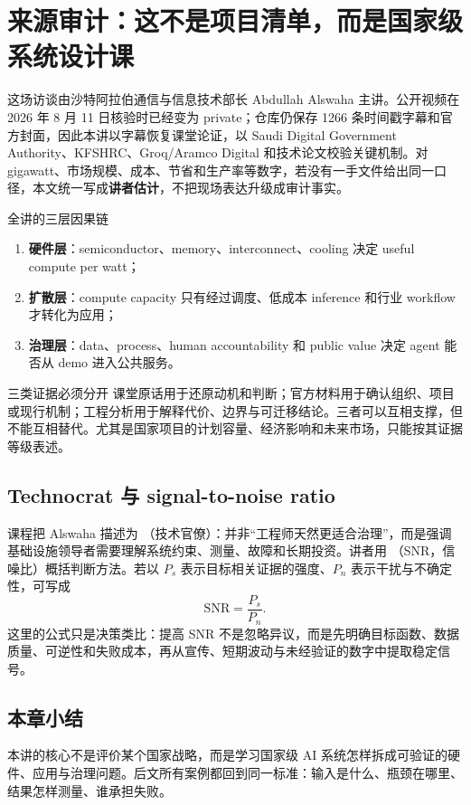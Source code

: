 \section{来源审计：这不是项目清单，而是国家级系统设计课}

这场访谈由沙特阿拉伯通信与信息技术部长 Abdullah Alswaha 主讲。公开视频在 2026 年 8 月 11 日核验时已经变为 private；仓库仍保存 1266 条时间戳字幕和官方封面，因此本讲以字幕恢复课堂论证，以 Saudi Digital Government Authority、KFSHRC、Groq/Aramco Digital 和技术论文校验关键机制。对 gigawatt、市场规模、成本、节省和生产率等数字，若没有一手文件给出同一口径，本文统一写成\textbf{讲者估计}，不把现场表达升级成审计事实。

\begin{importantbox}{全讲的三层因果链}
\begin{enumerate}
  \item \textbf{硬件层}：semiconductor、memory、interconnect、cooling 决定 useful compute per watt；
  \item \textbf{扩散层}：compute capacity 只有经过调度、低成本 inference 和行业 workflow 才转化为应用；
  \item \textbf{治理层}：data、process、human accountability 和 public value 决定 agent 能否从 demo 进入公共服务。
\end{enumerate}
\end{importantbox}

\begin{warningbox}{三类证据必须分开}
课堂原话用于还原动机和判断；官方材料用于确认组织、项目或现行机制；工程分析用于解释代价、边界与可迁移结论。三者可以互相支撑，但不能互相替代。尤其是国家项目的计划容量、经济影响和未来市场，只能按其证据等级表述。
\end{warningbox}

\subsection{Technocrat 与 signal-to-noise ratio}

课程把 Alswaha 描述为 （技术官僚）：并非“工程师天然更适合治理”，而是强调基础设施领导者需要理解系统约束、测量、故障和长期投资。讲者用 （SNR，信噪比）概括判断方法。若以 $P_s$ 表示目标相关证据的强度、$P_n$ 表示干扰与不确定性，可写成
\[
\mathrm{SNR}=\frac{P_s}{P_n}.
\]
这里的公式只是决策类比：提高 SNR 不是忽略异议，而是先明确目标函数、数据质量、可逆性和失败成本，再从宣传、短期波动与未经验证的数字中提取稳定信号。


\subsection{本章小结}

本讲的核心不是评价某个国家战略，而是学习国家级 AI 系统怎样拆成可验证的硬件、应用与治理问题。后文所有案例都回到同一标准：输入是什么、瓶颈在哪里、结果怎样测量、谁承担失败。

